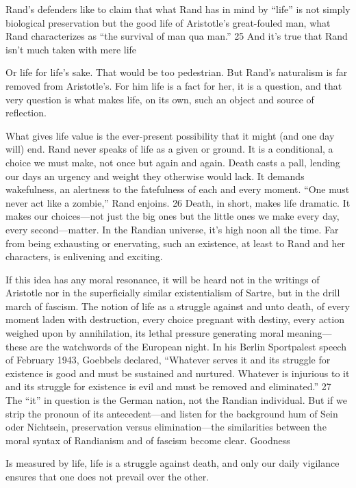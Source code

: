  \par 
Rand’s defenders like to claim that what Rand has in mind by “life” is not simply biological preservation but the good life of Aristotle’s great-fouled man, what Rand characterizes as “the survival of man qua man.” {\color{blue}25} And it’s true that Rand isn’t much taken with mere life
 \par 
Or life for life’s sake. That would be too pedestrian. But Rand’s naturalism is far removed from Aristotle’s. For him life is a fact for her, it is a question, and that very question is what makes life, on its own, such an object and source of reflection.
 \par 
What gives life value is the ever-present possibility that it might (and one day will) end. Rand never speaks of life as a given or ground. It is a conditional, a choice we must make, not once but again and again. Death casts a pall, lending our days an urgency and weight they otherwise would lack. It demands wakefulness, an alertness to the fatefulness of each and every moment. “One must never act like a zombie,” Rand enjoins. {\color{blue}26} Death, in short, makes life dramatic. It makes our choices—not just the big ones but the little ones we make every day, every second—matter. In the Randian universe, it’s high noon all the time. Far from being exhausting or enervating, such an existence, at least to Rand and her characters, is enlivening and exciting.
 \par 
If this idea has any moral resonance, it will be heard not in the writings of Aristotle nor in the superficially similar existentialism of Sartre, but in the drill march of fascism. The notion of life as a struggle against and unto death, of every moment laden with destruction, every choice pregnant with destiny, every action weighed upon by annihilation, its lethal pressure generating moral meaning— these are the watchwords of the European night. In his Berlin Sportpalest speech of February 1943, Goebbels declared, “Whatever serves it and its struggle for existence is good and must be sustained and nurtured. Whatever is injurious to it and its struggle for existence is evil and must be removed and eliminated.” {\color{blue}27} The “it” in question is the German nation, not the Randian individual. But if we strip the pronoun of its antecedent—and listen for the background hum of Sein oder Nichtsein, preservation versus elimination—the similarities between the moral syntax of Randianism and of fascism become clear. Goodness
 \par 
Is measured by life, life is a struggle against death, and only our daily vigilance ensures that one does not prevail over the other.
